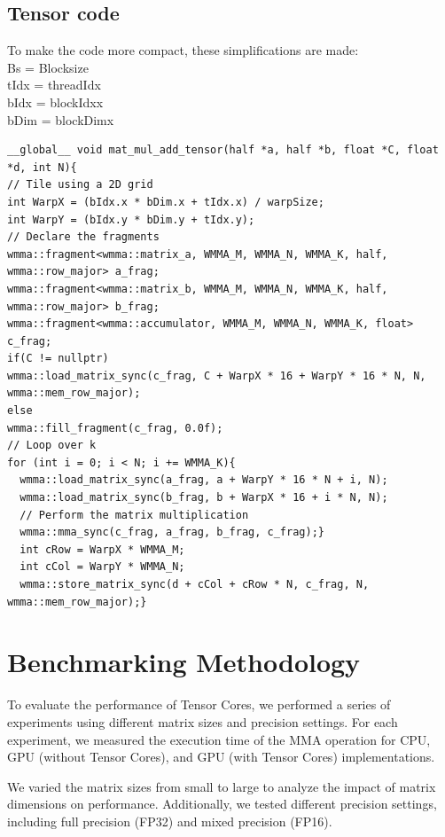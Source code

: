 \documentclass[conference]{IEEEtran}
\begin{document}
  \subsection{Tensor code}\label{sec:TensorCode}
  To make the code more compact, these simplifications are made:\\
  Bs = Blocksize \\
  tIdx = threadIdx \\
  bIdx = blockIdxx \\
  bDim = blockDimx

  \begin{lstlisting}
__global__ void mat_mul_add_tensor(half *a, half *b, float *C, float *d, int N){
// Tile using a 2D grid
int WarpX = (bIdx.x * bDim.x + tIdx.x) / warpSize;
int WarpY = (bIdx.y * bDim.y + tIdx.y);
// Declare the fragments
wmma::fragment<wmma::matrix_a, WMMA_M, WMMA_N, WMMA_K, half, wmma::row_major> a_frag;
wmma::fragment<wmma::matrix_b, WMMA_M, WMMA_N, WMMA_K, half, wmma::row_major> b_frag;
wmma::fragment<wmma::accumulator, WMMA_M, WMMA_N, WMMA_K, float> c_frag;
if(C != nullptr)
wmma::load_matrix_sync(c_frag, C + WarpX * 16 + WarpY * 16 * N, N, wmma::mem_row_major);
else
wmma::fill_fragment(c_frag, 0.0f);
// Loop over k
for (int i = 0; i < N; i += WMMA_K){
  wmma::load_matrix_sync(a_frag, a + WarpY * 16 * N + i, N);
  wmma::load_matrix_sync(b_frag, b + WarpX * 16 + i * N, N);
  // Perform the matrix multiplication
  wmma::mma_sync(c_frag, a_frag, b_frag, c_frag);}
  int cRow = WarpX * WMMA_M;
  int cCol = WarpY * WMMA_N;
  wmma::store_matrix_sync(d + cCol + cRow * N, c_frag, N, wmma::mem_row_major);}
  \end{lstlisting}


  \section{Benchmarking Methodology}\label{sec:benchmarking-methodology}
  
  To evaluate the performance of Tensor Cores, we performed a series of experiments using different matrix sizes and precision settings. For each experiment, we measured the execution time of the MMA operation for CPU, GPU (without Tensor Cores), and GPU (with Tensor Cores) implementations.
  
  We varied the matrix sizes from small to large to analyze the impact of matrix dimensions on performance. Additionally, we tested different precision settings, including full precision (FP32) and mixed precision (FP16).
  
\end{document}
